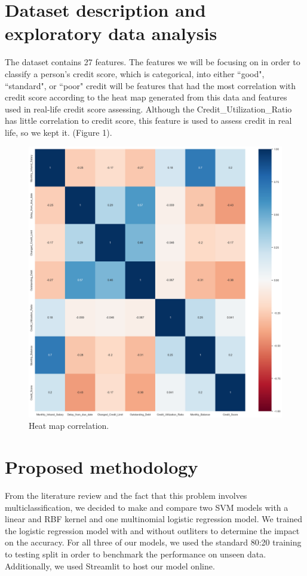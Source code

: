 \documentclass[11pt]{article}
\begin{document}
\begin{multicols}{2}
\section*{Dataset description and exploratory data analysis}
The dataset contains 27 features. The features we will be focusing on in order
to classify a person's credit score, which is categorical, into either ``good", ``standard", or ``poor" credit
will be features that had the most correlation with credit score according to the heat map
generated from this data and features used in real-life credit score assessing. Although the Credit\_Utilization\_Ratio has little 
correlation to credit score, this feature is used to assess credit in real life, so we kept it. (Figure 1).\\
\begin{figure}[h]
    \includegraphics[width=\columnwidth]{credscoreheatmap.png}
    \caption{Heat map correlation.}
    \label{fig:figure1}
\end{figure}
\section*{Proposed methodology}
From the literature review and the fact that this problem involves multiclassification,
we decided to make and compare two SVM models with a linear and RBF kernel and one 
multinomial logistic regression model. We trained the logistic regression model with and without
outliters to determine the impact on the accuracy. For all three of our models, we used
the standard 80:20 training to testing split in order to benchmark the performance on unseen
data. Additionally, we used Streamlit to host our model online.


\end{multicols}
\end{document}
